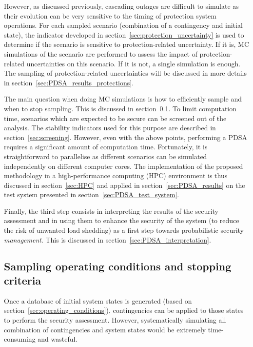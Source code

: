 However, as discussed previously, cascading outages are difficult to simulate as their evolution can be very sensitive to the timing of protection system operations. For each sampled scenario (combination of a contingency and initial state), the indicator developed in section~\ref{sec:protection_uncertainty} is used to determine if the scenario is sensitive to protection-related uncertainty. If it is, MC simulations of the scenario are performed to assess the impact of protection-related uncertainties on this scenario. If it is not, a single simulation is enough. The sampling of protection-related uncertainties will be discussed in more details in section~\ref{sec:PDSA_results_protections}.

The main question when doing MC simulations is how to efficiently sample and when to stop sampling. This is discussed in section~\ref{sec:sampling}. To limit computation time, scenarios which are expected to be secure can be screened out of the analysis. The stability indicators used for this purpose are described in section~\ref{sec:screening}. However, even with the above points, performing a PDSA requires a significant amount of computation time. Fortunately, it is straightforward to parallelise as different scenarios can be simulated independently on different computer cores. The implementation of the proposed methodology in a high-performance computing (HPC) environment is thus discussed in section~\ref{sec:HPC} and applied in section~\ref{sec:PDSA_results} on the test system presented in section~\ref{sec:PDSA_test_system}.

Finally, the third step consists in interpreting the results of the security assessment and in using them to enhance the security of the system (\ie to reduce the risk of unwanted load shedding) as a first step towards probabilistic security \emph{management}. This is discussed in section~\ref{sec:PDSA_interpretation}.


\subsection{Sampling operating conditions and stopping criteria}
\label{sec:sampling}

Once a database of initial system states is generated (based on section~\ref{sec:operating_conditions}), contingencies can be applied to those states to perform the security assessment. However, systematically simulating all combination of contingencies and system states would be extremely time-consuming and wasteful.

